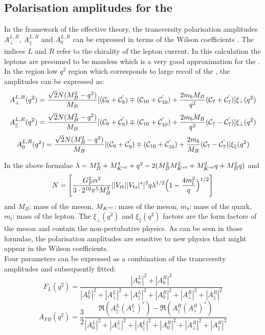 \subsection{Polarisation amplitudes for the \BdKstee}
\label{sub:polamp}
In the framework of the effective theory, the transversity polarisation amplitudes $A^{L,R}_{ \perp }$, $A^{L,R}_{ \parallel }$ and $A^{L,R}_0$ can be expressed in terms of the Wilson coefficients \cite{krueger}. The indices $L$ and $R$ refer to the chirality of the lepton current. In this calculation the leptons are presumed to be massless which is a very good approximation for the \BdKstee. In the region low $q^2$ region which corresponds to large recoil of the \Kstarz, the amplitudes can be expressed as:
\begin{equation}
A^{L,R}_{ \perp }(q^2) = \frac{ \sqrt{2} N (M^2_B - q^2) }{ M_B }[(\C9 + \Cp9 ) \mp (\C10 + \Cp10 )+\frac{ 2 m_b M_B }{ q^2 } (\C7 + \Cp7 )] \xi_{ \perp }(q^2)
\end{equation}
\begin{equation}
A^{L,R}_{ \parallel }(q^2) = \frac{ \sqrt{2} N (M^2_B - q^2) }{ M_B } [(\C9 + \Cp9 ) \mp (\C10 + \Cp10 )+ \frac{ 2 m_b M_B }{ q^2 }(\C7 - \Cp7 )] \xi_{ \perp }(q^2)
\end{equation}
\begin{equation}
A^{L,R}_0 (q^2) = \frac{ \sqrt{2} N (M^2_B - q^2) }{M_B } [(\C9 + \Cp9 ) \mp (\C10 + \Cp10 )+ \frac{2 m_b }{M_B }(\C7 - \Cp7 )] \xi_{ \parallel }(q^2)
\end{equation}
 
In the above formulae $ \lambda = M_B^4 + M_{K^{*0}}^4 + q^2 - 2(M_B^2 M_{K^{*0}}^2 + M_{K^{*0}}^2 q + M_B^2 q  ) $ and
\begin{equation}
N = \Bigg[ \frac{G_F^2 \alpha^2}{3 \cdot 2^{10}\pi^5 M_B^3} ||V_{tb}| |V_{ts}|^* |^2 q \lambda^{1/2} \Big( 1 - \frac{4 m_l^2}{q} \Big)^{1/2} \Bigg]
\end{equation}
and $M_B$: mass of the \B meson, $M_{K^{*0}} $: mass of the \Kstarz meson, $m_b $: mass of the \bquark quark, $m_l $: mass of the lepton. The  $\xi_{ \perp }(q^2)$ and  $\xi_{ \parallel }(q^2)$ factors are the form factors of the \Kstarz meson and contain the non-pertubative physics. As can be seen in those formulae, the polarisation amplitudes are sensitive to new physics that might appear in the Wilson coefficients.\\
Four parameters can be expressed as a combination of the transversity amplitudes and subsequently fitted:
\begin{equation}
F_L(q^2) = \frac{ |A^{L}_0|^2 + |A^{R}_0|^2 }{ |A^{L}_0|^2 + |A^{L}_{ \perp } |^2 + | A^{L}_{ \parallel } |^2 +  |A^{R}_0|^2  + | A^{R}_{ \perp } |^2 + | A^{R}_{ \parallel } |^2 }
\end{equation}
\begin{equation}
A_{FB}(q^2) = \frac{3}{2} \frac{ \Re ( A^L_{ \parallel }( A^L_{ \perp } )^* ) - \Re (A^R_{ \parallel }( A^R_{ \perp } )^* ) }{ | A^L_0 |^2 + | A^L_{ \perp } |^2 + | A^{L}_{ \parallel } |^2 +  | A^{R}_0 |^2  + | A^{R}_{ \perp } |^2 + |A^R_{ \parallel } |^2 }
\end{equation}

